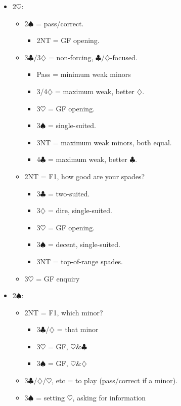 \documentclass[a4paper,14pt]{extarticle}
\begin{document}
\begin{itemize}
\item 2$\heartsuit$:
	\begin{itemize}
   \item 2$\spadesuit$ = pass/correct.
		\begin{itemize}
      \item 2NT = GF opening.
		\end{itemize}
   \item 3$\clubsuit$/3$\diamondsuit$ = non-forcing, $\clubsuit$/$\diamondsuit$-focused.
		\begin{itemize}
		\item Pass = minimum weak minors
      \item 3/4$\diamondsuit$ = maximum weak, better $\diamondsuit$.
      \item 3$\heartsuit$ = GF opening.
      \item 3$\spadesuit$ = single-suited.
      \item 3NT = maximum weak minors, both equal.
      \item 4$\clubsuit$ = maximum weak, better $\clubsuit$.
		\end{itemize}
   \item 2NT = F1, how good are your spades?
		\begin{itemize}
      \item 3$\clubsuit$ = two-suited.
      \item 3$\diamondsuit$ = dire, single-suited.
      \item 3$\heartsuit$ = GF opening.
      \item 3$\spadesuit$ = decent, single-suited.
      \item 3NT = top-of-range spades.
		\end{itemize}
	\item 3$\heartsuit$ = GF enquiry
	\end{itemize}

\newpage

\item 2$\spadesuit$:
	\begin{itemize}
   \item 2NT = F1, which minor?
		\begin{itemize}
      \item 3$\clubsuit$/$\diamondsuit$ = that minor
      \item 3$\heartsuit$ = GF, $\heartsuit$\&$\clubsuit$
      \item 3$\spadesuit$ = GF, $\heartsuit$\&$\diamondsuit$
		\end{itemize}
   \item 3$\clubsuit$/$\diamondsuit$/$\heartsuit$, etc = to play (pass/correct if a minor).
   \item 3$\spadesuit$ = setting $\heartsuit$, asking for information
	\end{itemize}


\end{itemize}
\end{document}
